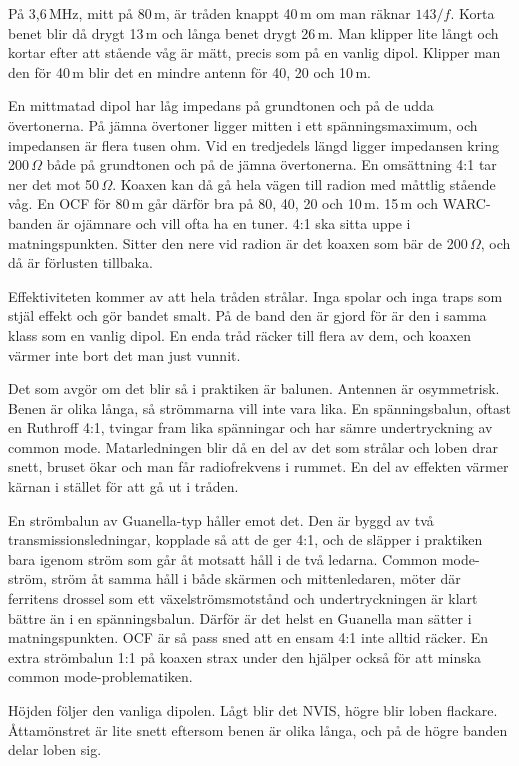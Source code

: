 På 3,6\,MHz, mitt på 80\,m, är tråden knappt 40\,m om man räknar
$143/f$. Korta benet blir då drygt 13\,m och långa benet drygt 26\,m.
Man klipper lite långt och kortar efter att stående våg är mätt,
precis som på en vanlig dipol. Klipper man den för 40\,m blir det en
mindre antenn för 40, 20 och 10\,m.

En mittmatad dipol har låg impedans på grundtonen och på de udda
övertonerna. På jämna övertoner ligger mitten i ett spänningsmaximum,
och impedansen är flera tusen ohm. Vid en tredjedels längd ligger
impedansen kring 200\,$\Omega$ både på grundtonen och på de jämna
övertonerna. En omsättning 4:1 tar ner det mot 50\,$\Omega$. Koaxen
kan då gå hela vägen till radion med måttlig stående våg. En OCF för
80\,m går därför bra på 80, 40, 20 och 10\,m. 15\,m och WARC-banden är
ojämnare och vill ofta ha en tuner. 4:1 ska sitta uppe i
matningspunkten. Sitter den nere vid radion är det koaxen som bär de
200\,$\Omega$, och då är förlusten tillbaka.

Effektiviteten kommer av att hela tråden strålar. Inga spolar och inga
traps som stjäl effekt och gör bandet smalt. På de band den är gjord
för är den i samma klass som en vanlig dipol. En enda tråd räcker till
flera av dem, och koaxen värmer inte bort det man just vunnit.

Det som avgör om det blir så i praktiken är balunen. Antennen är
osymmetrisk. Benen är olika långa, så strömmarna vill inte vara lika.
En spänningsbalun, oftast en Ruthroff 4:1, tvingar fram lika
spänningar och har sämre undertryckning av common mode. Matarledningen
blir då en del av det som strålar och loben drar snett, bruset ökar
och man får radiofrekvens i rummet. En del av effekten värmer kärnan i
stället för att gå ut i tråden.

En strömbalun av Guanella-typ håller emot det. Den är byggd av två
transmissionsledningar, kopplade så att de ger 4:1, och de släpper i
praktiken bara igenom ström som går åt motsatt håll i de två
ledarna. Common mode-ström, ström åt samma håll i både skärmen och
mittenledaren, möter där ferritens drossel som ett växelströmsmotstånd
och undertryckningen är klart bättre än i en spänningsbalun. Därför är
det helst en Guanella man sätter i matningspunkten. OCF är så pass
sned att en ensam 4:1 inte alltid räcker. En extra strömbalun 1:1 på
koaxen strax under den hjälper också för att minska common
mode-problematiken.

Höjden följer den vanliga dipolen. Lågt blir det NVIS, högre blir
loben flackare. Åttamönstret är lite snett eftersom benen är olika
långa, och på de högre banden delar loben sig.

